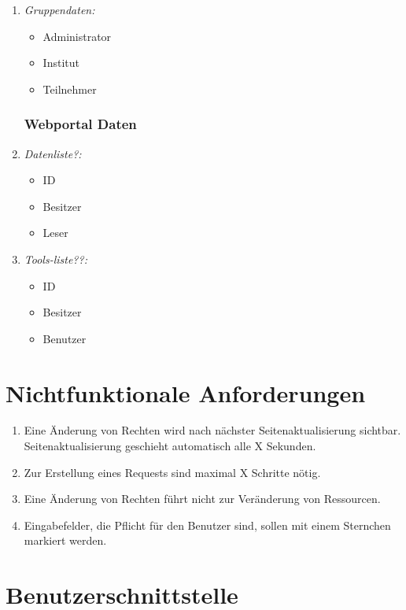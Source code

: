 \documentclass[parskip=full,11pt]{scrartcl}
\def\threedigits#1{%
  \ifnum#1<10 0\fi
  \ifnum#1<1 0\fi
  \number#1}
\begin{document}
\begin{enumerate}[label={\textbf{/D\protect\threedigits{\theenumi}0/}}, leftmargin=*]
\begin{itemize}
\end{itemize}

\item \textit{Gruppendaten:}
\begin{itemize}
\item Administrator
\item Institut
\item Teilnehmer
 \end{itemize}
 
\subsubsection{Webportal Daten}
\item \textit{Datenliste?:}
\begin{itemize}
\item ID
\item Besitzer
\item Leser
 \end{itemize}
 
 \item \textit{Tools-liste??:}
\begin{itemize}
\item ID
\item Besitzer
\item Benutzer
 \end{itemize}

\end{enumerate}
\section{Nichtfunktionale Anforderungen}
\begin{enumerate}[label={\textbf{/NF\protect\threedigits{\theenumi}0/}}, leftmargin=*]
\item Eine Änderung von Rechten wird nach nächster Seitenaktualisierung sichtbar. Seitenaktualisierung geschieht automatisch alle X Sekunden.
\item Zur Erstellung eines Requests sind maximal X Schritte nötig.
\item Eine Änderung von Rechten führt nicht zur Veränderung von Ressourcen.
\item Eingabefelder, die Pflicht für den Benutzer sind, sollen mit einem Sternchen markiert werden.
\end{enumerate}



\section{Benutzerschnittstelle}
\end{document}
